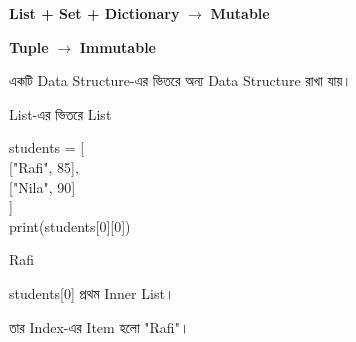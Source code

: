 \begin{rememberbox}

\begin{center}

\textbf{List + Set + Dictionary}
\(\longrightarrow\)
\textbf{Mutable}

\qquad

\textbf{Tuple}
\(\longrightarrow\)
\textbf{Immutable}

\end{center}

\end{rememberbox}



একটি Data Structure-এর ভিতরে অন্য Data Structure রাখা যায়।

\begin{codeoutputbox}{List-এর ভিতরে List}

\noindent
\begin{minipage}[t]{0.56\linewidth}
\codeheading

\begin{english}
\ttfamily
students = [\\
\hspace*{4mm}["Rafi", 85],\\
\hspace*{4mm}["Nila", 90]\\
]\\
print(students[0][0])
\end{english}

\end{minipage}
\hfill
\begin{minipage}[t]{0.40\linewidth}
\outputheading

\begin{center}
\textenglish{\ttfamily Rafi}
\end{center}

\textenglish{\ttfamily students[0]}
প্রথম Inner List।

তার
\textenglish{\ttfamily [0]}
Index-এর Item হলো
\textenglish{\ttfamily "Rafi"}।

\end{minipage}

\end{codeoutputbox}


